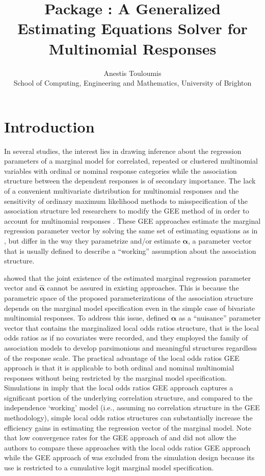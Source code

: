\documentclass[article,shortnames,nojss]{jss}
\author{Anestis Touloumis\\ School of Computing, Engineering and Mathematics, University of Brighton}
\title{\proglang{R} Package \pkg{multgee}: A Generalized Estimating Equations Solver for Multinomial Responses}
\begin{document}



\section{Introduction}
In several studies, the interest lies in drawing inference about the regression parameters of a marginal model for correlated, repeated or clustered multinomial variables with ordinal or nominal response categories while the association structure between the dependent responses is of secondary importance. The lack of a convenient multivariate distribution for multinomial responses and the sensitivity of ordinary maximum likelihood methods to misspecification of the association structure led researchers to modify the GEE method of \cite{Liang1986} in order to account for multinomial responses \citep{Miller1993,Lipsitz1994,Williamson1995,Lumley1996,Heagerty1996,Parsons2006}. These GEE approaches estimate the marginal regression parameter vector by solving the same set of estimating equations as in \cite{Liang1986}, but differ in the way they parametrize and/or estimate $\boldsymbol \alpha$, a parameter vector that is usually defined to describe a ``working'' assumption about the association structure. 

\cite{Touloumis2012} showed that the joint existence of the estimated marginal regression parameter vector and $\hat{\boldsymbol \alpha}$ cannot be assured in existing approaches. This is because the parametric space of the proposed parameterizations of the association structure depends on the marginal model specification even in the simple case of bivariate multinomial responses. To address this issue, \cite{Touloumis2012} defined $\boldsymbol \alpha$ as a ``nuisance'' parameter vector that contains the marginalized local odds ratios structure, that is the local odds ratios as if no covariates were recorded, and they employed the family of association models \citep{Goodman1985} to develop parsimonious and meaningful structures regardless of the response scale. The practical advantage of the local odds ratios GEE approach is that it is applicable to both ordinal and nominal multinomial responses without being restricted by the marginal model specification. Simulations in \cite{Touloumis2012} imply that the local odds ratios GEE approach captures a significant portion of the underlying correlation structure, and compared to the independence `working' model (i.e., assuming no correlation structure in the GEE methodology), simple local odds ratios structures can substantially increase the efficiency gains in estimating the regression vector of the marginal model. Note that low convergence rates for the GEE approach of \cite{Lumley1996} and \cite{Heagerty1996} did not allow the authors to compare these approaches with the local odds ratios GEE approach while the GEE approach of \cite{Parsons2006} was excluded from the simulation design because its use is restricted to a cumulative logit marginal model specification. 
\end{document}
